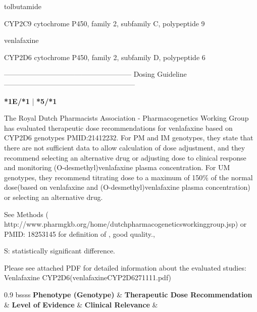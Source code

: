 \documentclass{resume} %
\begin{document}
\begin{rSection}{ tolbutamide }
\begin{rSubsection}{ CYP2C9 }{ cytochrome P450, family 2, subfamily C, polypeptide 9 }{}{}
\end{rSubsection}

\end{rSection}\begin{rSection}{ venlafaxine }
\item[]
\begin{rSubsection}{ CYP2D6 }{ cytochrome P450, family 2, subfamily D, polypeptide 6 }{}{}
\item[]
\item[] ------------------------------------------------------ Dosing Guideline --------------------------------------------------------\newline
\item[]
\item[] \textbf{ *1E/*1 } | \textbf{ *5/*1 }
\item The Royal Dutch Pharmacists Association - Pharmacogenetics Working Group has evaluated therapeutic dose recommendations for venlafaxine based on CYP2D6 genotypes PMID:21412232.  For PM and IM genotypes, they state that there are not sufficient data to allow calculation of dose adjustment, and they recommend selecting an alternative drug or adjusting dose to clinical response and monitoring (O-desmethyl)venlafaxine plasma concentration.  For UM genotypes, they recommend titrating dose to a maximum of 150\% of the normal dose(based on venlafaxine and (O-desmethyl)venlafaxine plasma concentration) or selecting an alternative drug.
 \newline
\item *See Methods ( http://www.pharmgkb.org/home/dutchpharmacogeneticsworkinggroup.jsp) or PMID: 18253145 for definition of , good quality., 
 \newline
\item S: statistically significant difference.
 \newline
\item Please see attached PDF for detailed information about the evaluated studies: Venlafaxine CYP2D6(venlafaxineCYP2D6271111.pdf) \newline
\vspace{1pt}\newline
		\scriptsize
		\begin{center}
		\begin{tabularx}{0.9\textwidth}{ bssss }
		\textbf{ Phenotype (Genotype) }&\textbf{ Therapeutic Dose Recommendation }&\textbf{ Level of Evidence }&\textbf{ Clinical Relevance }&\textbf{
}\\
		\vspace{1pt}\\

\end{tabularx}
\end{center}
\end{rSubsection}
\end{rSection}
\end{document}
